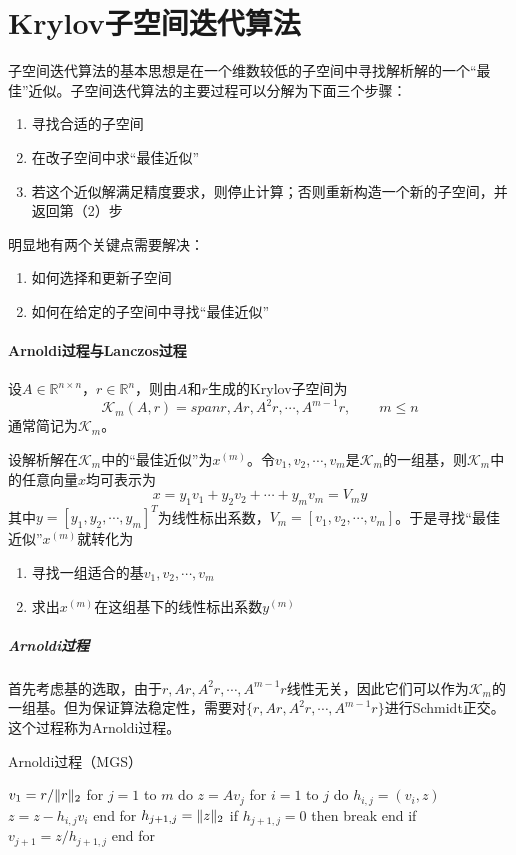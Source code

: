 \documentclass[UTF8]{article}
\begin{document}
\section{Krylov子空间迭代算法}
\begin{flushleft}
子空间迭代算法的基本思想是在一个维数较低的子空间中寻找解析解的一个“最佳”近似。子空间迭代算法的主要过程可以分解为下面三个步骤：
\begin{enumerate}[(1)]
  \item 寻找合适的子空间
  \item 在改子空间中求“最佳近似”
  \item 若这个近似解满足精度要求，则停止计算；否则重新构造一个新的子空间，并返回第（2）步
\end{enumerate}

明显地有两个关键点需要解决：
\begin{enumerate}[(1)]
  \item 如何选择和更新子空间
  \item 如何在给定的子空间中寻找“最佳近似”
\end{enumerate}

\paragraph{Arnoldi过程与Lanczos过程}
设$A \in \mathbb{R}^{n \times n}$，$r \in \mathbb{R}^n$，则由$A$和$r$生成的Krylov子空间为
$$\mathcal{K}_m(A,r)=span{r,Ar,A^2r,\cdots,A^{m-1}r}, \qquad m \leq n$$
通常简记为$\mathcal{K}_m$。\newline

设解析解在$\mathcal{K}_m$中的“最佳近似”为$x^{(m)}$。令$v_1,v_2,\cdots,v_m$是$\mathcal{K}_m$的一组基，则$\mathcal{K}_m$中的任意向量$x$均可表示为
$$x=y_1v_1+y_2v_2+\cdots+y_mv_m=V_my$$
其中$y=[y_1,y_2,\cdots,y_m]^T$为线性标出系数，$V_m=[v_1,v_2,\cdots,v_m]$。于是寻找“最佳近似”$x^{(m)}$就转化为
\begin{enumerate}[(1)]
  \item 寻找一组适合的基$v_1,v_2,\cdots,v_m$
  \item 求出$x^{(m)}$在这组基下的线性标出系数$y^{(m)}$
\end{enumerate}

\subparagraph{Arnoldi过程}
首先考虑基的选取，由于$r,Ar,A^2r,\cdots,A^{m-1}r$线性无关，因此它们可以作为$\mathcal{K}_m$的一组基。但为保证算法稳定性，需要对$\{ r,Ar,A^2r,\cdots,A^{m-1}r \}$进行Schmidt正交。这个过程称为\textcolor[rgb]{0.00,0.07,1.00}{Arnoldi过程}。

\begin{algorithm}[H]
\caption{Arnoldi过程（MGS）}
\begin{algorithmic}[1]
  \State $v_1=r/\Arrowvert r \Arrowvert _2$
  \State for $j=1$ to $m$ do
  \State \qquad $z=Av_j$
  \State \qquad for $i=1$ to $j$ do
  \State \qquad \qquad $h_{i,j}=(v_i,z)$
  \State \qquad \qquad $z=z-h_{i,j}v_i$
  \State \qquad end for
  \State \qquad $h_{j+1,j}=\Arrowvert z \Arrowvert _2$
  \State \qquad if $h_{j+1,j}=0$ then
  \State \qquad \qquad break
  \State \qquad end if
  \State \qquad $v_{j+1}=z/h_{j+1,j}$
  \State end for
\end{algorithmic}
\end{algorithm}


\end{flushleft}
\end{document}
